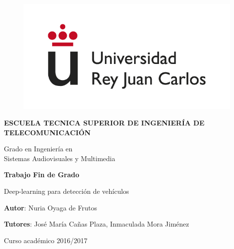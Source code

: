 \begin{titlepage}

\begin{center}

\begin{figure}[htb]
\begin{center}
	\includegraphics[width=0.6\linewidth]{figures/logo}
\end{center}
\end{figure}

\vspace{10mm}

\begin{Large}
\textbf{ESCUELA TECNICA SUPERIOR DE INGENIERÍA DE TELECOMUNICACIÓN}
\vspace{10mm}
\end{Large}

\begin{Large}
Grado en Ingeniería en\\ \vspace{2mm} Sistemas Audiovisuales y Multimedia
\end{Large}

\vspace{10mm}

\begin{large}
\textbf{Trabajo Fin de Grado}
\end{large}
\vspace{25mm}

\begin{huge}
	Deep-learning para detección de vehículos
\end{huge}

\vspace{25mm}

\begin{large}
\textbf{Autor}: Nuria Oyaga de Frutos

\textbf{Tutores}: José María Cañas Plaza, Inmaculada Mora Jiménez 

\vspace{10mm}

Curso académico 2016/2017
\end{large}

\vspace{10mm}

\end{center}

\end{titlepage}


